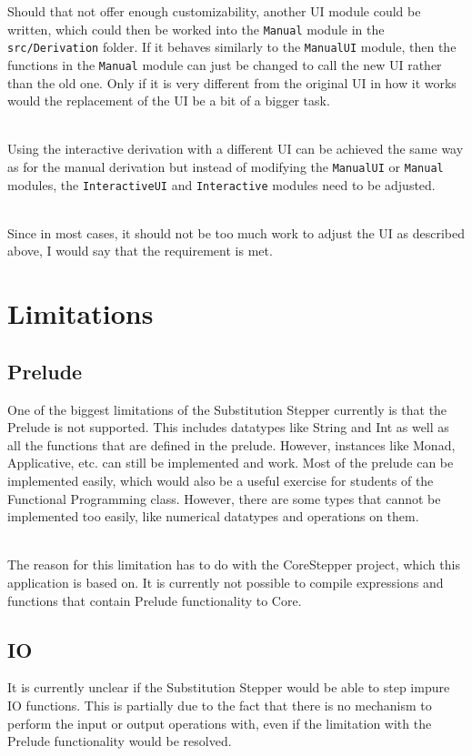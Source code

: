 Should that not offer enough customizability,
another UI module could be written,
which could then be worked into the \texttt{Manual} module in the \texttt{src/Derivation} folder.
If it behaves similarly to the \texttt{ManualUI} module,
then the functions in the \texttt{Manual} module can just be changed to call the new UI rather than the old one.
Only if it is very different from the original UI in how it works would the replacement of the UI be a bit of a bigger task.

\ \\
Using the interactive derivation with a different UI can be achieved the same way as for the manual derivation but instead of modifying the \texttt{ManualUI} or \texttt{Manual} modules,
the \texttt{InteractiveUI} and \texttt{Interactive} modules need to be adjusted.

\ \\
Since in most cases,
it should not be too much work to adjust the UI as described above,
I would say that the requirement is met.

\section{Limitations}

\subsection{Prelude}
One of the biggest limitations of the Substitution Stepper currently is that the Prelude is not supported.
This includes datatypes like String and Int as well as all the functions that are defined in the prelude.
However, instances like Monad, Applicative, etc. can still be implemented and work.
Most of the prelude can be implemented easily,
which would also be a useful exercise for students of the Functional Programming class.
However, there are some types that cannot be implemented too easily,
like numerical datatypes and operations on them.

\ \\
The reason for this limitation has to do with the CoreStepper project,
which this application is based on.
It is currently not possible to compile expressions and functions that contain Prelude functionality to Core.

\subsection{IO}
It is currently unclear if the Substitution Stepper would be able to step impure IO functions.
This is partially due to the fact that there is no mechanism to perform the input or output operations with,
even if the limitation with the Prelude functionality would be resolved.

